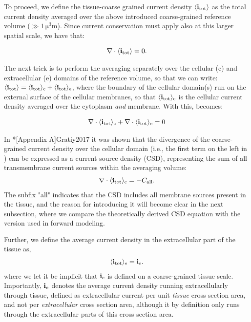 To proceed, we define the tissue-coarse grained current density $\left<{\bf i}_\text{tot}\right>$ 
as the total current density averaged over the above introduced coarse-grained reference volume
($\gg 1 \, \si{\cubic\micro\metre}$). 
Since current conservation must apply also at this larger spatial scale, we have that:

\begin{equation}
{\bf \nabla} \cdot \langle{\bf i}_\text{tot}\rangle = 0.
\label{eq:VC:Sergey2}
\end{equation}

The next trick is to perform the averaging separately over 
the cellular (c) and extracellular (e) domains of the reference volume, so that we can write: 
$\langle{\bf i}_\text{tot}\rangle = \langle{\bf i}_\text{tot}\rangle_\text{c} + \langle{\bf i}_\text{tot}\rangle_\text{e}$, 
where the boundary of the cellular domain(s) run on the external surface of the cellular membranes,
so that $\langle{\bf i}_\text{tot}\rangle_\text{c}$ is the cellular current density averaged over the cytoplasm \emph{and} membrane. With this,  becomes: 

\begin{equation}
{\bf \nabla} \cdot \langle{\bf i}_\text{tot}\rangle_\text{c}  + {\bf \nabla}\cdot \langle{\bf i}_\text{tot}\rangle_\text{e} = 0
\label{eq:VC:Sergey3}
\end{equation}

In \citeasnoun**[Appendix A]{Gratiy2017} it was shown that the divergence of the coarse-grained current density 
over the cellular domain (i.e., the first term on the left in ) 
can be expressed as a current source density (CSD), representing the
sum of all transmembrane current sources within the averaging volume: 
\begin{equation}
{\bf \nabla} \cdot \langle{\bf i}_\text{tot}\rangle_\text{c}  = - C_\mathrm{all}.
\label{eq:VC:Sergey4}
\end{equation}
The subfix "all" indicates that the CSD includes all membrane sources present in the tissue, 
and the reason for introducing it will become clear in the next subsection, where we compare 
the theoretically derived CSD equation with the version used in forward modeling. 

Further, we define the average current density in the extracellular part of the tissue as, 
\begin{equation}
\langle{\bf i}_\text{tot}\rangle_\text{e} = {\bf i}_\text{e}.
\label{eq:VC:Sergey5}
\end{equation}
where we let it be implicit that ${\bf i}_\text{e}$ is defined on a coarse-grained tissue scale. 
Importantly, ${\bf i}_\text{e}$ denotes the average current density running extracellularly through tissue, 
defined as extracellular current per unit \textit{tissue} cross section area, 
and not per \textit{extracellular} cross section area, 
although it by definition only runs through the extracellular parts of this cross section area.

